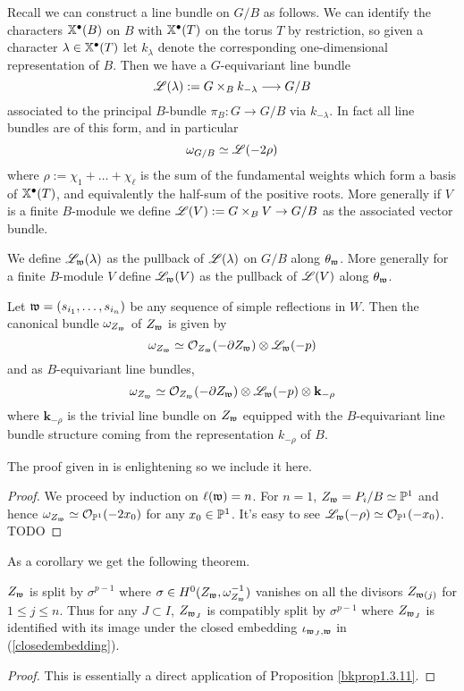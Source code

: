 \documentclass[12pt]{article}
\begin{document}
Recall we can construct a line bundle on $G/B$ as follows. We can identify the characters $\mathbb{X}^{\bullet}(B)$ on $B$ with $\mathbb{X}^{\bullet}(T)$ on the torus $T$ by restriction, so given a character $\lambda \in \mathbb{X}^{\bullet}(T)$ let $k_{\lambda}$ denote the corresponding one-dimensional representation of $B$. Then we have a $G$-equivariant line bundle
\[\mathscr{L}(\lambda) := G \times_B k_{-\lambda} \longrightarrow G/B\]
associated to the principal $B$-bundle $\pi_B \colon G \to G/B$ via $k_{-\lambda}$. In fact all line bundles are of this form, and in particular 
\[\omega_{G/B} \simeq \mathscr{L}(-2\rho)\]
where $\rho := \chi_1 + \ldots + \chi_{\ell}$ is the sum of the fundamental weights which form a basis of $\mathbb{X}^{\bullet}(T)$, and equivalently the half-sum of the positive roots. More generally if $V$ is a finite $B$-module we define $\mathscr{L}(V) := G \times_B V \to G/B$ as the associated vector bundle.

We define $\mathscr{L}_{\mathfrak{w}}(\lambda)$ as the pullback of $\mathscr{L}(\lambda)$ on $G/B$ along $\theta_{\mathfrak{w}}$. More generally for a finite $B$-module $V$ define $\mathscr{L}_{\mathfrak{w}}(V)$ as the pullback of $\mathscr{L}(V)$ along $\theta_{\mathfrak{w}}$.

\begin{prop}
    Let $\mathfrak{w} = (s_{i_1}, \ldots, s_{i_n})$ be any sequence of simple reflections in $W$. Then the canonical bundle $\omega_{Z_{\mathfrak{w}}}$ of $Z_{\mathfrak{w}}$ is given by 
    \[\omega_{Z_{\mathfrak{w}}} \simeq \mathcal{O}_{Z_{\mathfrak{w}}}(-\partial Z_{\mathfrak{w}}) \otimes \mathscr{L}_{\mathfrak{w}}(-p)\]
    and as $B$-equivariant line bundles,
    \[\omega_{Z_{\mathfrak{w}}} \simeq \mathcal{O}_{Z_{\mathfrak{w}}}(-\partial Z_{\mathfrak{w}}) \otimes \mathscr{L}_{\mathfrak{w}}(-p) \otimes \mathbf{k}_{-\rho}\]
    where $\mathbf{k}_{-\rho}$ is the trivial line bundle on $Z_{\mathfrak{w}}$ equipped with the $B$-equivariant line bundle structure coming from the representation $k_{-\rho}$ of $B$.
\end{prop}

The proof given in \cite{Brion2004FrobeniusSM} is enlightening so we include it here.
\begin{proof}
    We proceed by induction on $\ell(\mathfrak{w}) = n$. For $n = 1$, $Z_{\mathfrak{w}} = P_i/B \simeq \mathbb{P}^1$ and hence $\omega_{Z_{\mathfrak{w}}} \simeq \mathcal{O}_{\mathbb{P}^1}(-2x_0)$ for any $x_0 \in \mathbb{P}^1$. It's easy to see $\mathscr{L}_{\mathfrak{w}}(-\rho) \simeq \mathcal{O}_{\mathbb{P}^1}(-x_0)$. TODO
\end{proof}

As a corollary we get the following theorem.

\begin{thm}
    $Z_{\mathfrak{w}}$ is split by $\sigma^{p-1}$ where $\sigma \in H^0(Z_{\mathfrak{w}}, \omega_{Z_{\mathfrak{w}}}^{-1})$ vanishes on all the divisors $Z_{\mathfrak{w}(j)}$ for $1 \leq j \leq n$. Thus for any $J \subset I$, $Z_{\mathfrak{w}_J}$ is compatibly split by $\sigma^{p-1}$ where $Z_{\mathfrak{w}_J}$ is identified with its image under the closed embedding $\iota_{\mathfrak{w}_J, \mathfrak{w}}$ in (\ref{closedembedding}).
\end{thm}
\begin{proof}
    This is essentially a direct application of Proposition \ref{bkprop1.3.11}.
\end{proof}

\newpage

\printbibliography
\end{document}
